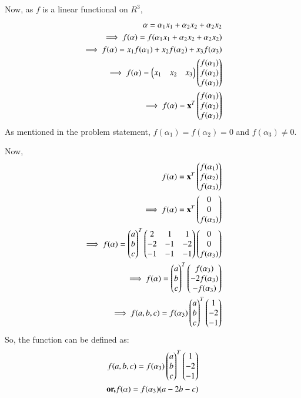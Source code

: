 Now, as $f$ is a linear functional on $R^3$,
\begin{align}
\mathbf{\alpha} = \alpha_1 x_1 + \alpha_2 x_2 + \alpha_2 x_2\\
\implies f(\alpha) = f(\alpha_1 x_1 + \alpha_2 x_2 + \alpha_2 x_2)\\
\implies f(\alpha) = x_1 f(\alpha_1) + x_2f(\alpha_2)+ x_3f(\alpha_3)\\
\implies f(\alpha) = \begin{pmatrix}x_1 & x_2 & x_3\end{pmatrix} \begin{pmatrix}f(\alpha_1)\\f(\alpha_2)\\f(\alpha_3)\end{pmatrix}\\
\implies f(\alpha) = \mathbf{x}^T \begin{pmatrix}f(\alpha_1)\\f(\alpha_2)\\f(\alpha_3)\end{pmatrix}
\end{align}
As mentioned in the problem statement, $f(\alpha_1)=f(\alpha_2)=0$ and $f(\alpha_3)\neq 0$.

Now,
\begin{align}
f(\alpha) = \mathbf{x}^T \begin{pmatrix}f(\alpha_1)\\f(\alpha_2)\\f(\alpha_3)\end{pmatrix}\\
\implies f(\alpha) =  \mathbf{x}^T \begin{pmatrix}0\\0\\f(\alpha_3)\end{pmatrix}\\
\implies f(\alpha) = \begin{pmatrix}a\\b\\c\end{pmatrix}^T \begin{pmatrix}2 & 1 & 1\\-2 & -1 & -2\\-1 & -1 & -1\end{pmatrix} \begin{pmatrix}0\\0\\f(\alpha_3)\end{pmatrix}\\
\implies f(\alpha) = \begin{pmatrix}a\\b\\c\end{pmatrix}^T \begin{pmatrix}f(\alpha_3)\\-2f(\alpha_3)\\-f(\alpha_3)\end{pmatrix}\\
\implies f(a,b,c) = f(\alpha_3) \begin{pmatrix}a\\b\\c\end{pmatrix}^T \begin{pmatrix}1\\-2\\-1\end{pmatrix}
\end{align}
So, the function can be defined as:
\begin{align}
f(a,b,c) = f(\alpha_3) \begin{pmatrix}a\\b\\c\end{pmatrix}^T \begin{pmatrix}1\\-2\\-1\end{pmatrix}\\
\textbf{or,} f(\mathbf{\alpha}) = f(\alpha_3) (a-2b-c)
\end{align}
